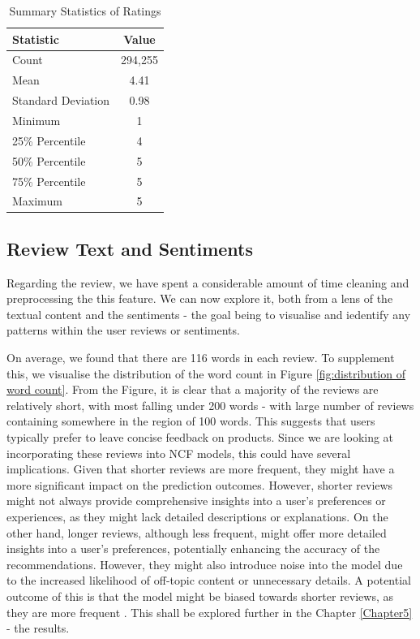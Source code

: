 \begin{table}[ht]
  \centering
  \begin{tabular}{l c}
      \hline
      \textbf{Statistic} & \textbf{Value} \\
      \hline
      Count & 294,255 \\
      Mean & 4.41 \\
      Standard Deviation & 0.98 \\
      Minimum & 1 \\
      25\% Percentile & 4 \\
      50\% Percentile & 5 \\
      75\% Percentile & 5 \\
      Maximum & 5 \\
      \hline
  \end{tabular}
  \caption{Summary Statistics of Ratings}
  \label{tab:rating summary}
\end{table}

\subsection{Review Text and Sentiments}
\label{subsec:3 Review Text}

Regarding the review, we have spent a considerable amount of time cleaning and preprocessing the this feature. We can now explore it, both from a lens of the textual content and the sentiments - the goal being to visualise and iedentify any patterns within the user reviews or sentiments. 

On average, we found that there are 116 words in each review. To supplement this, we visualise the distribution of the word count in Figure \ref{fig:distribution of word count}. From the Figure, it is clear that a majority of the reviews are relatively short, with most falling under 200 words - with large number of reviews containing somewhere in the region of 100 words. This suggests that users typically prefer to leave concise feedback on products. Since we are looking at incorporating these reviews into NCF models, this could have several implications. Given that shorter reviews are more frequent, they might have a more significant impact on the prediction outcomes. However, shorter reviews might not always provide comprehensive insights into a user’s preferences or experiences, as they might lack detailed descriptions or explanations. On the other hand, longer reviews, although less frequent, might offer more detailed insights into a user’s preferences, potentially enhancing the accuracy of the recommendations. However, they might also introduce noise into the model due to the increased likelihood of off-topic content or unnecessary details. A potential outcome of this is that the model might be biased towards shorter reviews, as they are more frequent \cite{srifi2020recommender}. This shall be explored further in the Chapter \ref{Chapter5} - the results.


